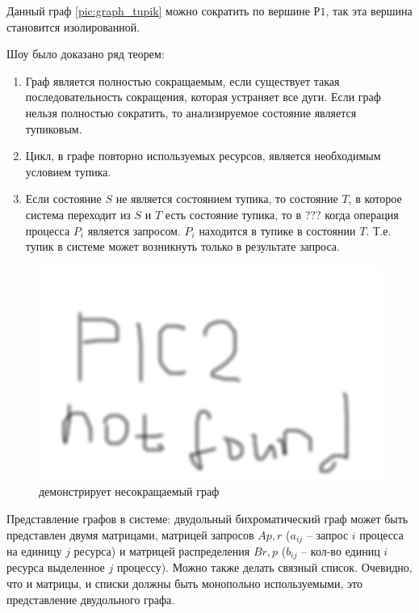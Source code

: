 Данный граф \ref{pic:graph_tupik} можно сократить по вершине $Р1$, так эта вершина становится изолированной.

Шоу было доказано ряд теорем:
\begin{enumerate}
    \item Граф является полностью сокращаемым, если существует такая последовательность сокращения, которая устраняет все дуги. Если граф нельзя полностью сократить, то анализируемое состояние является тупиковым. 
    \item Цикл, в графе повторно используемых ресурсов, является необходимым условием тупика.
    \item Если состояние $S$ не является состоянием тупика, то состояние $T$, в которое система переходит из $S$ и $T$ есть состояние тупика, то в ??? когда операция процесса $P_i$ является запросом. $P_i$  находится в тупике в состоянии $T$. Т.е. тупик в системе может возникнуть только в результате запроса.     
\end{enumerate} 

\begin{figure}[H]
    \centering
    \includegraphics[width=\textwidth]{pic/2.png}
    \caption{демонстрирует несокращаемый граф}
\end{figure}

Представление графов в системе: двудольный бихроматический граф может быть представлен двумя матрицами, матрицей запросов $A{p, r}$ ($a_{ij}$ – запрос $i$ процесса на единицу $j$ ресурса) и матрицей распределения $B{r, p}$ ($b_{ij}$ – кол-во единиц $i$ ресурса выделенное $j$ процессу). Можно также делать связный список. Очевидно, что и матрицы, и списки должны быть монопольно используемыми, это представление двудольного графа.

